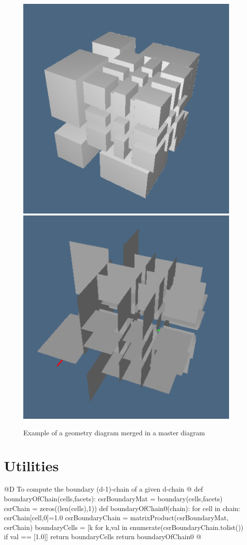 \documentclass[11pt,oneside]{article}	%
\begin{document}
\begin{figure}[htbp] %
   \centering
   \includegraphics[height=0.49\linewidth,width=0.49\linewidth]{images/mastermerged} 
   \includegraphics[height=0.49\linewidth,width=0.49\linewidth]{images/masterfacets} 
   \caption{Example of a geometry diagram merged in a master diagram}
   \label{fig:mastermerged}
\end{figure}


\appendix
\section{Utilities}



@D To compute the boundary (d-1)-chain of a given d-chain
@{
def boundaryOfChain(cells,facets):
	csrBoundaryMat = boundary(cells,facets)
	csrChain = zeros((len(cells),1))
	def boundaryOfChain0(chain):
		for cell in chain:  csrChain[cell,0]=1.0
		csrBoundaryChain = matrixProduct(csrBoundaryMat, csrChain)
		boundaryCells = [k for k,val in enumerate(csrBoundaryChain.tolist()) 
							if val == [1.0]]
		return boundaryCells
	return boundaryOfChain0
@}
\end{document}
